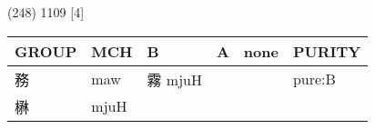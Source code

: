 \documentclass[14pt,a4paper]{scrartcl}
\begin{document}
(248) 1109 {[}4{]}

\begin{longtable}[c]{@{}llllll@{}}
\toprule
\begin{minipage}[b]{0.14\columnwidth}\raggedright\strut
GROUP
\strut\end{minipage} &
\begin{minipage}[b]{0.14\columnwidth}\raggedright\strut
MCH
\strut\end{minipage} &
\begin{minipage}[b]{0.14\columnwidth}\raggedright\strut
B
\strut\end{minipage} &
\begin{minipage}[b]{0.14\columnwidth}\raggedright\strut
A
\strut\end{minipage} &
\begin{minipage}[b]{0.14\columnwidth}\raggedright\strut
none
\strut\end{minipage} &
\begin{minipage}[b]{0.14\columnwidth}\raggedright\strut
PURITY
\strut\end{minipage}\tabularnewline
\midrule
\endhead
\begin{minipage}[t]{0.14\columnwidth}\raggedright\strut
務
\strut\end{minipage} &
\begin{minipage}[t]{0.14\columnwidth}\raggedright\strut
maw
\strut\end{minipage} &
\begin{minipage}[t]{0.14\columnwidth}\raggedright\strut
霧 mjuH
\strut\end{minipage} &
\begin{minipage}[t]{0.14\columnwidth}\raggedright\strut
\strut\end{minipage} &
\begin{minipage}[t]{0.14\columnwidth}\raggedright\strut
\strut\end{minipage} &
\begin{minipage}[t]{0.14\columnwidth}\raggedright\strut
pure:B
\strut\end{minipage}\tabularnewline
\begin{minipage}[t]{0.14\columnwidth}\raggedright\strut
楙
\strut\end{minipage} &
\begin{minipage}[t]{0.14\columnwidth}\raggedright\strut
mjuH
\strut\end{minipage} &
\begin{minipage}[t]{0.14\columnwidth}\raggedright\strut
\strut\end{minipage} &

\end{longtable}
\end{document}
